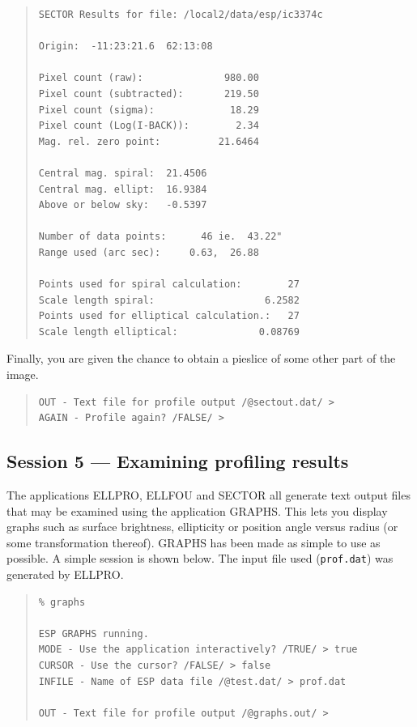\documentclass[twoside,11pt]{article}
\newcommand{\xlabel}[1]{}
\newenvironment{myquote}{\begin{quote}\begin{small}}{\end{small}\end{quote}}
\begin{document}
\begin{myquote}
\begin{verbatim}
SECTOR Results for file: /local2/data/esp/ic3374c

Origin:  -11:23:21.6  62:13:08

Pixel count (raw):              980.00
Pixel count (subtracted):       219.50
Pixel count (sigma):             18.29
Pixel count (Log(I-BACK)):        2.34
Mag. rel. zero point:          21.6464

Central mag. spiral:  21.4506
Central mag. ellipt:  16.9384
Above or below sky:   -0.5397

Number of data points:      46 ie.  43.22"
Range used (arc sec):     0.63,  26.88

Points used for spiral calculation:        27
Scale length spiral:                   6.2582
Points used for elliptical calculation.:   27
Scale length elliptical:              0.08769
\end{verbatim}
\end{myquote}

Finally, you are given the chance to obtain a pieslice of some other
part of the image.

\begin{myquote}
\begin{verbatim}
OUT - Text file for profile output /@sectout.dat/ >  
AGAIN - Profile again? /FALSE/ > 
\end{verbatim}
\end{myquote}


\subsection{Session 5 --- Examining profiling results}
\xlabel{SESSION5}

The applications ELLPRO, ELLFOU and SECTOR all generate text output
files that may be examined using the application GRAPHS. This lets
you display graphs such as surface brightness, ellipticity or position
angle versus radius (or some transformation thereof). GRAPHS
has been made as simple to use as possible. A simple session is shown below.
The input file used ({\tt prof.dat}) was generated by ELLPRO.

\begin{myquote}
\begin{verbatim}
% graphs
 
ESP GRAPHS running.
MODE - Use the application interactively? /TRUE/ > true
CURSOR - Use the cursor? /FALSE/ > false
INFILE - Name of ESP data file /@test.dat/ > prof.dat
 
OUT - Text file for profile output /@graphs.out/ > 
\end{verbatim}
\end{myquote}
\end{document}
